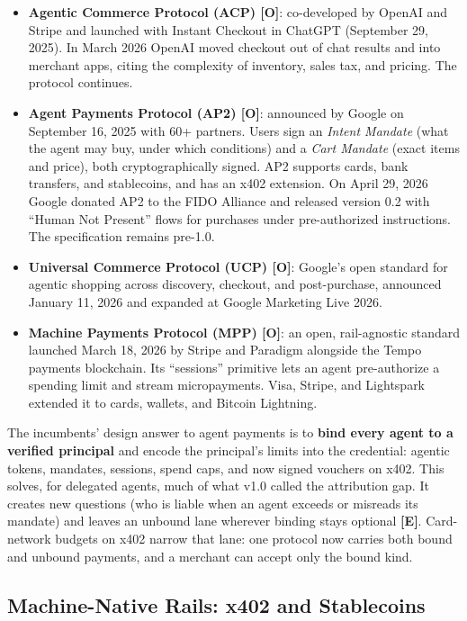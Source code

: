 \documentclass[11pt,letterpaper]{article}
\begin{document}
\begin{itemize}
  \item \textbf{Agentic Commerce Protocol (ACP) [O]}: co-developed by OpenAI and Stripe and launched with Instant Checkout in ChatGPT (September 29, 2025). In March 2026 OpenAI moved checkout out of chat results and into merchant apps, citing the complexity of inventory, sales tax, and pricing. The protocol continues.
  \item \textbf{Agent Payments Protocol (AP2) [O]}: announced by Google on September 16, 2025 with 60+ partners. Users sign an \textit{Intent Mandate} (what the agent may buy, under which conditions) and a \textit{Cart Mandate} (exact items and price), both cryptographically signed. AP2 supports cards, bank transfers, and stablecoins, and has an x402 extension. On April 29, 2026 Google donated AP2 to the FIDO Alliance and released version 0.2 with ``Human Not Present'' flows for purchases under pre-authorized instructions. The specification remains pre-1.0.
  \item \textbf{Universal Commerce Protocol (UCP) [O]}: Google's open standard for agentic shopping across discovery, checkout, and post-purchase, announced January 11, 2026 and expanded at Google Marketing Live 2026.
  \item \textbf{Machine Payments Protocol (MPP) [O]}: an open, rail-agnostic standard launched March 18, 2026 by Stripe and Paradigm alongside the Tempo payments blockchain. Its ``sessions'' primitive lets an agent pre-authorize a spending limit and stream micropayments. Visa, Stripe, and Lightspark extended it to cards, wallets, and Bitcoin Lightning.
\end{itemize}

\begin{keybox}
The incumbents' design answer to agent payments is to \textbf{bind every agent to a verified principal} and encode the principal's limits into the credential: agentic tokens, mandates, sessions, spend caps, and now signed vouchers on x402. This solves, for delegated agents, much of what v1.0 called the attribution gap. It creates new questions (who is liable when an agent exceeds or misreads its mandate) and leaves an unbound lane wherever binding stays optional \textbf{[E]}. Card-network budgets on x402 narrow that lane: one protocol now carries both bound and unbound payments, and a merchant can accept only the bound kind.
\end{keybox}

\subsection{Machine-Native Rails: x402 and Stablecoins}
\end{document}

